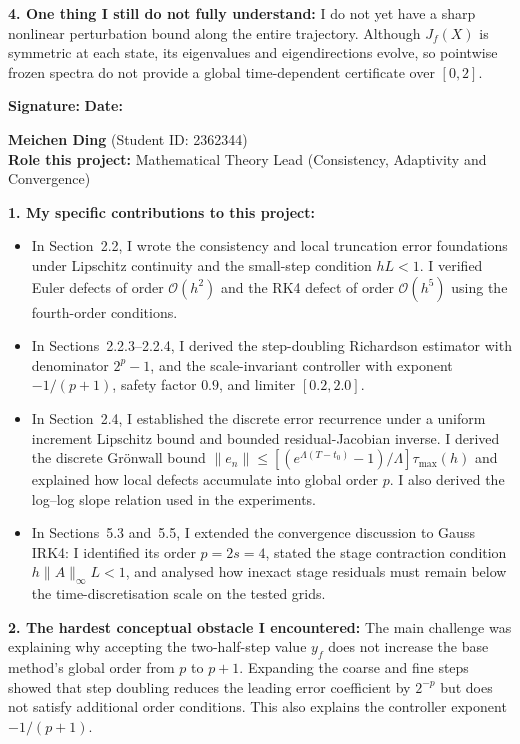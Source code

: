 \begin{formbox}
\textbf{4. One thing I still do not fully understand:}
I do not yet have a sharp nonlinear perturbation bound along the entire
trajectory. Although $J_f(X)$ is symmetric at each state, its eigenvalues and
eigendirections evolve, so pointwise frozen spectra do not provide a global
time-dependent certificate over $[0,2]$.

\textbf{Signature:} \underline{\hspace{4.5cm}} \hfill
\textbf{Date:} \underline{\hspace{2.5cm}}
\end{formbox}
\clearpage
\begin{formbox}
\footnotesize
\textbf{Meichen Ding} (Student ID: 2362344)\\
\textbf{Role this project:} Mathematical Theory Lead (Consistency,
Adaptivity and Convergence)

\textbf{1. My specific contributions to this project:}
\begin{itemize}[leftmargin=1.3em,itemsep=1pt,topsep=1pt]
    \item In Section~2.2, I wrote the consistency and local truncation error
    foundations under Lipschitz continuity and the small-step condition
    $hL<1$. I verified Euler defects of order $\mathcal{O}(h^2)$ and the RK4
    defect of order $\mathcal{O}(h^5)$ using the fourth-order conditions.
    \item In Sections~2.2.3--2.2.4, I derived the step-doubling Richardson
    estimator with denominator $2^p-1$, and the scale-invariant controller
    with exponent $-1/(p+1)$, safety factor $0.9$, and limiter $[0.2,2.0]$.
    \item In Section~2.4, I established the discrete error recurrence under a
    uniform increment Lipschitz bound and bounded residual-Jacobian inverse. I
    derived the discrete Gr\"onwall bound
    $\|e_n\|\leq[(e^{\Lambda(T-t_0)}-1)/\Lambda]\tau_{\max}(h)$ and explained
    how local defects accumulate into global order $p$. I also derived the
    log--log slope relation used in the experiments.
    \item In Sections~5.3 and~5.5, I extended the convergence discussion to
    Gauss IRK4: I identified its order $p=2s=4$, stated the stage contraction
    condition $h\|A\|_\infty L<1$, and analysed how inexact stage residuals
    must remain below the time-discretisation scale on the tested grids.
\end{itemize}

\textbf{2. The hardest conceptual obstacle I encountered:}
The main challenge was explaining why accepting the two-half-step value $y_f$
does not increase the base method's global order from $p$ to $p+1$. Expanding
the coarse and fine steps showed that step doubling reduces the leading error
coefficient by $2^{-p}$ but does not satisfy additional order conditions. This
also explains the controller exponent $-1/(p+1)$.


\end{formbox}
